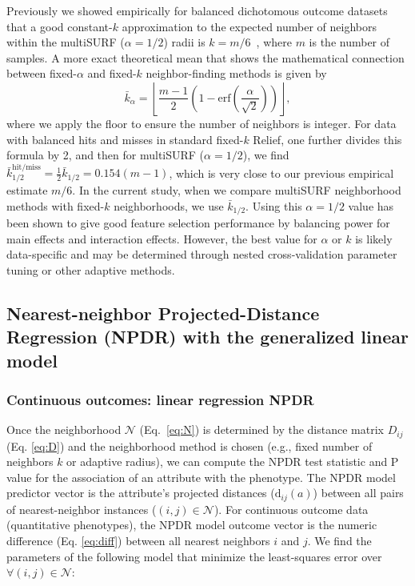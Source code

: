 \documentclass{bioinfo}
\begin{document}
Previously we showed empirically for balanced dichotomous outcome datasets that a good constant-$k$ approximation to the expected number of neighbors within the multiSURF ($\alpha=1/2$) radii is $k=m/6$~\citep{stir}, where $m$ is the number of samples.
A more exact theoretical mean that shows the mathematical connection between fixed-$\alpha$ and fixed-$k$ neighbor-finding methods is given by 
\begin{equation}\label{eq:kbar}
{\bar{k}}_{\alpha} = \left \lfloor \frac{m-1}{2}  \left( 1 - \mathrm{erf}\left( \frac{\alpha}{\sqrt{2}} \right) \right) \right \rfloor,
\end{equation}
where we apply the floor to ensure the number of neighbors is integer.
For data with balanced hits and misses in standard fixed-$k$ Relief, one further divides this formula by 2, and then for multiSURF ($\alpha=1/2$), we find $\bar{k}_{1/2}^{\text{hit/miss}} = \frac{1}{2}\bar{k}_{1/2} = 0.154 (m-1)$, which is very close to our previous empirical estimate $m/6$.
In the current study, when we compare multiSURF neighborhood methods with fixed-$k$ neighborhoods, we use $\bar{k}_{1/2}$.
Using this $\alpha=1/2$ value has been shown to give good feature selection performance by balancing power for main effects and interaction effects.
However, the best value for $\alpha$ or $k$ is likely data-specific and may be determined through nested cross-validation parameter tuning or other adaptive methods.

\subsection{Nearest-neighbor Projected-Distance Regression (NPDR) with the generalized linear model}

\subsubsection{Continuous outcomes: linear regression NPDR}\label{sec:regress}

Once the neighborhood $\mathcal{N}$ (Eq.~\ref{eq:N}) is determined by the distance matrix $D_{ij}$ (Eq. \ref{eq:D}) and the neighborhood method is chosen (e.g., fixed number of neighbors $k$ or adaptive radius), we can compute the NPDR test statistic and P value for the association of an attribute with the phenotype.
The NPDR model predictor vector is the attribute's projected distances ($\text{d}_{ij}(a)$) between all pairs of nearest-neighbor instances ($(i,j) \in \mathcal{N}$).
For continuous outcome data (quantitative phenotypes), the NPDR model outcome vector is the numeric difference (Eq. \ref{eq:diff}) between all nearest neighbors $i$ and $j$.
We find the parameters of the following model that minimize the least-squares error over $\forall(i,j) \in \mathcal{N}$: 
\end{document}
